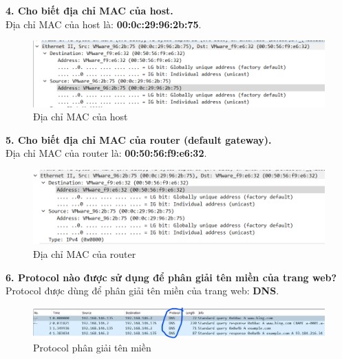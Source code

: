 \textbf{4. Cho biết địa chỉ MAC của host.}\\
Địa chỉ MAC của host là: \textbf{00:0c:29:96:2b:75}.
\begin{figure}[H]
\begin{center}
\includegraphics[scale=1]{../figures/p2/p2_hostmac}
\end{center}
\caption{Địa chỉ MAC của host}
\end{figure}

\textbf{5.	Cho biết địa chỉ MAC của router (default gateway).}\\
Địa chỉ MAC của router là: \textbf{00:50:56:f9:e6:32}.
\begin{figure}[H]
\begin{center}
\includegraphics[scale=1]{../figures/p2/p2_routermac}
\end{center}
\caption{Địa chỉ MAC của router}
\end{figure}

\textbf{6.	Protocol nào được sử dụng để phân giải tên miền của trang web?}\\
Protocol được dùng để phân giải tên miền của trang web: \textbf{DNS}.
\begin{figure}[H]
\begin{center}
\includegraphics[scale=1]{../figures/p2/p2_protocol1}
\end{center}
\caption{Protocol phân giải tên miền}
\end{figure}

